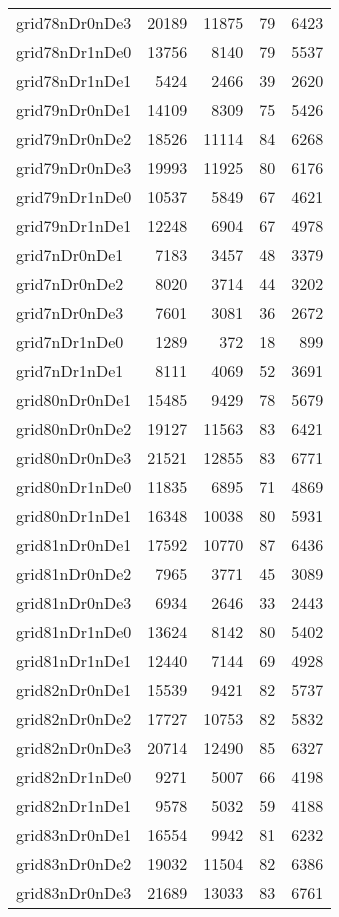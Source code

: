 \begin{longtable}{lrrrr}
grid78nDr0nDe3 & 20189 & 11875 & 79 & 6423 \\
grid78nDr1nDe0 & 13756 & 8140 & 79 & 5537 \\
grid78nDr1nDe1 & 5424 & 2466 & 39 & 2620 \\
grid79nDr0nDe1 & 14109 & 8309 & 75 & 5426 \\
grid79nDr0nDe2 & 18526 & 11114 & 84 & 6268 \\
grid79nDr0nDe3 & 19993 & 11925 & 80 & 6176 \\
grid79nDr1nDe0 & 10537 & 5849 & 67 & 4621 \\
grid79nDr1nDe1 & 12248 & 6904 & 67 & 4978 \\
grid7nDr0nDe1 & 7183 & 3457 & 48 & 3379 \\
grid7nDr0nDe2 & 8020 & 3714 & 44 & 3202 \\
grid7nDr0nDe3 & 7601 & 3081 & 36 & 2672 \\
grid7nDr1nDe0 & 1289 & 372 & 18 & 899 \\
grid7nDr1nDe1 & 8111 & 4069 & 52 & 3691 \\
grid80nDr0nDe1 & 15485 & 9429 & 78 & 5679 \\
grid80nDr0nDe2 & 19127 & 11563 & 83 & 6421 \\
grid80nDr0nDe3 & 21521 & 12855 & 83 & 6771 \\
grid80nDr1nDe0 & 11835 & 6895 & 71 & 4869 \\
grid80nDr1nDe1 & 16348 & 10038 & 80 & 5931 \\
grid81nDr0nDe1 & 17592 & 10770 & 87 & 6436 \\
grid81nDr0nDe2 & 7965 & 3771 & 45 & 3089 \\
grid81nDr0nDe3 & 6934 & 2646 & 33 & 2443 \\
grid81nDr1nDe0 & 13624 & 8142 & 80 & 5402 \\
grid81nDr1nDe1 & 12440 & 7144 & 69 & 4928 \\
grid82nDr0nDe1 & 15539 & 9421 & 82 & 5737 \\
grid82nDr0nDe2 & 17727 & 10753 & 82 & 5832 \\
grid82nDr0nDe3 & 20714 & 12490 & 85 & 6327 \\
grid82nDr1nDe0 & 9271 & 5007 & 66 & 4198 \\
grid82nDr1nDe1 & 9578 & 5032 & 59 & 4188 \\
grid83nDr0nDe1 & 16554 & 9942 & 81 & 6232 \\
grid83nDr0nDe2 & 19032 & 11504 & 82 & 6386 \\
grid83nDr0nDe3 & 21689 & 13033 & 83 & 6761 \\

\end{longtable}
